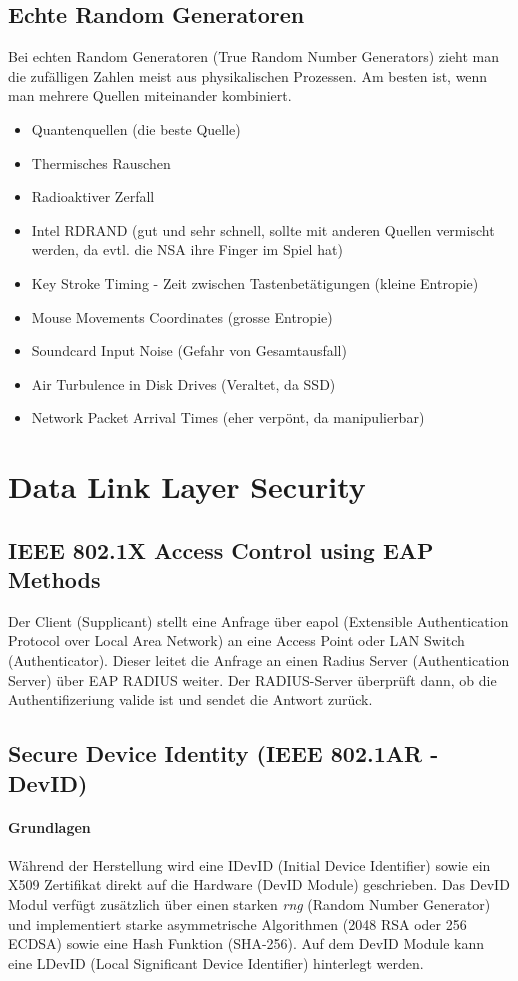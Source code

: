 \subsection{Echte Random Generatoren}
Bei echten Random Generatoren (True Random Number Generators) zieht man die zufälligen Zahlen meist aus physikalischen Prozessen. Am besten ist, wenn man mehrere Quellen miteinander kombiniert.
\begin{itemize}
	\item Quantenquellen (die beste Quelle)
	\item Thermisches Rauschen 
	\item Radioaktiver Zerfall
	\item Intel RDRAND (gut und sehr schnell, sollte mit anderen Quellen vermischt werden, da evtl. die NSA ihre Finger im Spiel hat)
	\item Key Stroke Timing - Zeit zwischen Tastenbetätigungen (kleine Entropie)
	\item Mouse Movements Coordinates (grosse Entropie)
	\item Soundcard Input Noise (Gefahr von Gesamtausfall)
	\item Air Turbulence in Disk Drives (Veraltet, da SSD)
	\item Network Packet Arrival Times (eher verpönt, da manipulierbar)
\end{itemize}


\section{Data Link Layer Security}

\subsection{IEEE 802.1X Access Control using EAP Methods}
Der Client (Supplicant) stellt eine Anfrage über eapol (Extensible Authentication Protocol over Local Area Network) an eine Access Point oder LAN Switch (Authenticator). Dieser leitet die Anfrage an einen Radius Server (Authentication Server) über EAP RADIUS weiter. Der RADIUS-Server überprüft dann, ob die Authentifizeriung valide ist und sendet die Antwort zurück.

\subsection{Secure Device Identity (IEEE 802.1AR - DevID)}
\paragraph{Grundlagen}
Während der Herstellung wird eine IDevID (Initial Device Identifier) sowie ein X509 Zertifikat direkt auf die Hardware (DevID Module) geschrieben. Das DevID Modul verfügt zusätzlich über einen starken \textit{rng} (Random Number Generator) und implementiert starke asymmetrische Algorithmen (2048 RSA oder 256 ECDSA) sowie eine Hash Funktion (SHA-256). Auf dem DevID Module kann eine LDevID (Local Significant Device Identifier) hinterlegt werden. \\

